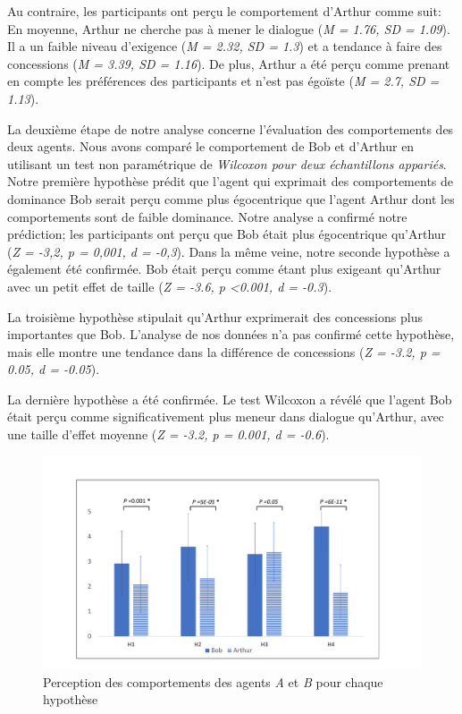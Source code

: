 {		Au contraire, les participants ont perçu le comportement d'Arthur comme suit: En moyenne, Arthur ne cherche pas à mener le dialogue (\emph {M = 1.76, SD = 1.09}). Il a un faible niveau d'exigence (\emph {M = 2.32, SD = 1.3}) et a tendance à faire des concessions (\emph {M = 3.39, SD = 1.16}). De plus, Arthur a été perçu comme prenant en compte les préférences des participants et n'est pas égoïste (\emph {M = 2.7, SD = 1.13}).
		
		La deuxième étape de notre analyse concerne l'évaluation des comportements des deux agents. Nous avons comparé le comportement de Bob et d'Arthur en utilisant un test non paramétrique de \emph{Wilcoxon pour deux échantillons appariés}. Notre première hypothèse prédit que l'agent qui exprimait des comportements de dominance Bob serait perçu comme plus égocentrique que l'agent Arthur dont les comportements sont de faible dominance. Notre analyse a confirmé notre prédiction; les participants ont perçu que Bob était plus égocentrique qu'Arthur (\emph {Z = -3,2, p = 0,001, d = -0,3}). Dans la même veine, notre seconde hypothèse a également été confirmée. Bob était perçu comme étant plus exigeant qu'Arthur avec un petit effet de taille (\emph {Z = -3.6, p <0.001, d = -0.3}).
		
		La troisième hypothèse stipulait qu'Arthur exprimerait des concessions plus importantes que Bob. L'analyse de nos données n'a pas confirmé cette hypothèse, mais elle montre une tendance dans la différence de concessions (\emph {Z = -3.2, p = 0.05, d = -0.05}).
		
		La dernière hypothèse a été confirmée. Le test Wilcoxon a révélé que l'agent Bob était perçu comme significativement plus meneur dans dialogue qu'Arthur, avec une taille d'effet moyenne (\emph {Z = -3.2, p = 0.001, d = -0.6}).
		
			
			
			\begin{figure}[t]
				\centering
				\includegraphics[width=\textwidth]{Figures/chap4/AH/res.pdf}
				\caption{Perception des comportements des agents \textit{A} et \textit{B} pour chaque hypothèse}
				\label{res}
				\end{figure}
				
}

